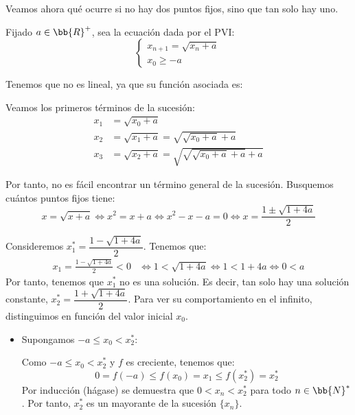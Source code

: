 Veamos ahora qué ocurre si no hay dos puntos fijos, sino que tan solo hay uno.
\begin{ejercicio*}
    Fijado $a\in \bb{R}^+$, sea la ecuación dada por el PVI:
    \begin{equation*}
    \left\{ \begin{array}{l}
        x_{n+1} = \sqrt{x_n+a} \\
        x_0 \geq -a
    \end{array}\right.
    \end{equation*}

    Tenemos que no es lineal, ya que su función asociada es:
    \Func{f}{[-a, \infty[}{[0, \infty[}{x}{\sqrt{x+a}}

    Veamos los primeros términos de la sucesión:
    \begin{align*}
        x_1 &= \sqrt{x_0+a}\\
        x_2 &= \sqrt{x_1+a} = \sqrt{\sqrt{x_0+a}+a} \\
        x_3 &= \sqrt{x_2+a} = \sqrt{\sqrt{\sqrt{x_0+a}+a}+a}
    \end{align*}

    Por tanto, no es fácil encontrar un término general de la sucesión. Busquemos cuántos puntos fijos tiene:
    \begin{equation*}
        x = \sqrt{x+a} \Longleftrightarrow x^2=x+a \Longleftrightarrow
        x^2-x-a = 0 \Longleftrightarrow x=\frac{1\pm \sqrt{1+4a}}{2}
    \end{equation*}

    Consideremos $x_1^\ast=\dfrac{1-\sqrt{1+4a}}{2}$. Tenemos que:
    \begin{align*}
        x_1 = \frac{1-\sqrt{1+4a}}{2} < 0 &\Longleftrightarrow
        1 < \sqrt{1+4a} \Longleftrightarrow 1 < 1+4a
        \Longleftrightarrow 0<a
    \end{align*}
    Por tanto, tenemos que $x_1^\ast$ no es una solución. Es decir, tan solo hay una solución constante, $x_2^\ast=\dfrac{1+\sqrt{1+4a}}{2}$.
    Para ver su comportamiento en el infinito, distinguimos en función del valor inicial $x_0$.
    \begin{itemize}
        \item Supongamos $-a \leq x_0 < x_2^\ast$:

        Como $-a \leq x_0 < x_2^\ast$ y $f$ es creciente, tenemos que:
        \begin{equation*}
            0= f(-a) \leq f(x_0)=x_1 \leq f(x_2^\ast) = x_2^\ast
        \end{equation*}
        Por inducción (hágase) se demuestra que $0 < x_n < x_2^\ast$ para todo $n\in \bb{N}^\ast$. Por tanto, $x_2^\ast$ es un mayorante de la sucesión $\{x_n\}$.
        

\end{itemize}
\end{ejercicio*}
